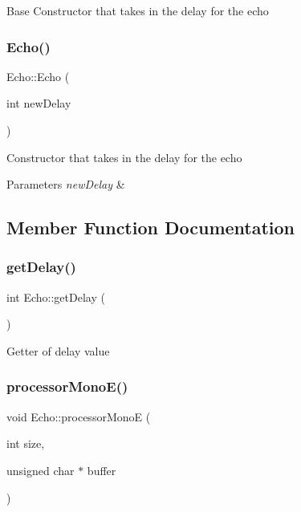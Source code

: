 Base Constructor that takes in the delay for the echo \mbox{\label{classEcho_a28d71de619dda9e6e51567a04bfb60d6}} 
\subsubsection{\texorpdfstring{Echo()}{Echo()}\hspace{0.1cm}{\footnotesize\ttfamily [2/2]}}
{\footnotesize\ttfamily Echo\+::\+Echo (\begin{DoxyParamCaption}\item[{int}]{new\+Delay }\end{DoxyParamCaption})}

Constructor that takes in the delay for the echo 
\begin{DoxyParams}{Parameters}
{\em new\+Delay} & \\
\hline
\end{DoxyParams}


\subsection{Member Function Documentation}
\mbox{\label{classEcho_a57e19c9232f9bb96ccd78ba4bb68d6c9}} 
\subsubsection{\texorpdfstring{get\+Delay()}{getDelay()}}
{\footnotesize\ttfamily int Echo\+::get\+Delay (\begin{DoxyParamCaption}{ }\end{DoxyParamCaption})}

Getter of delay value \mbox{\label{classEcho_a472cc906604bcb493c6a6c1227436938}} 
\subsubsection{\texorpdfstring{processor\+Mono\+E()}{processorMonoE()}}
{\footnotesize\ttfamily void Echo\+::processor\+MonoE (\begin{DoxyParamCaption}\item[{int}]{size,  }\item[{unsigned char $\ast$}]{buffer }\end{DoxyParamCaption})\hspace{0.3cm}{\ttfamily [virtual]}}

